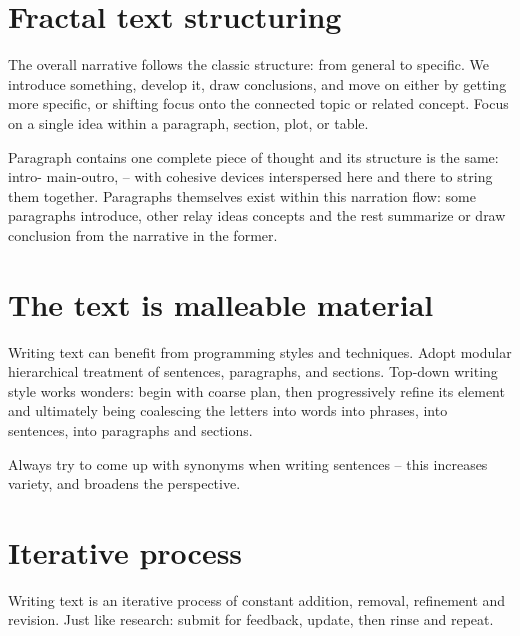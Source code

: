\documentclass[10pt,a4paper,twocolumn]{article}
\begin{document}

\section{Fractal text structuring} %
\label{sec:fractal_text_structuring}

The overall narrative follows the classic structure: from general to specific. We introduce
something, develop it, draw conclusions, and move on either by getting more specific, or
shifting focus onto the connected topic or related concept. Focus on a single idea within
a paragraph, section, plot, or table.

Paragraph contains one complete piece of thought and its structure is the same: intro-%
main-outro, -- with cohesive devices interspersed here and there to string them together.
Paragraphs themselves exist within this narration flow: some paragraphs introduce, other
relay ideas concepts and the rest summarize or draw conclusion from the narrative in the
former.


\section{The text is malleable material} %
\label{sec:the_text_is_malleable_material}

Writing text can benefit from programming styles and techniques. Adopt modular hierarchical
treatment of sentences, paragraphs, and sections. Top-down writing style works wonders:
begin with coarse plan, then progressively refine its element and ultimately being
coalescing the letters into words into phrases, into sentences, into paragraphs and
sections.

Always try to come up with synonyms when writing sentences -- this increases variety,
and broadens the perspective.



\section{Iterative process} %
\label{sec:iterative_process}

Writing text is an iterative process of constant addition, removal, refinement and
revision. Just like research: submit for feedback, update, then rinse and repeat.
\end{document}
